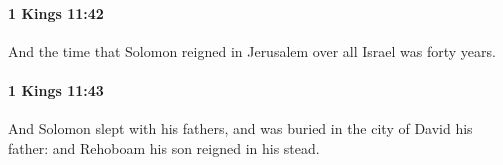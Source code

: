 		\paragraph{1 Kings 11:42} %
			\label{1KINGS-11-42}

			And the time that Solomon reigned in Jerusalem over all Israel was forty years.


		\paragraph{1 Kings 11:43} %
			\label{1KINGS-11-43}

			And Solomon slept with his fathers, and was buried in the city of David his father: and Rehoboam his son reigned in his stead.

